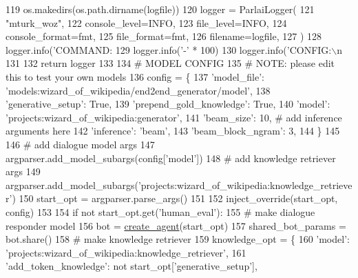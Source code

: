 \begin{DoxyCode}
{{119                 os.makedirs(os.path.dirname(logfile))
120         logger = ParlaiLogger(
121             \textcolor{stringliteral}{"mturk\_woz"},
122             console\_level=INFO,
123             file\_level=INFO,
124             console\_format=fmt,
125             file\_format=fmt,
126             filename=logfile,
127         )
128         logger.info(\textcolor{stringliteral}{'COMMAND: %
129         logger.info(\textcolor{stringliteral}{'-'} * 100)
130         logger.info(\textcolor{stringliteral}{'CONFIG:\(\backslash\)n%
131 
132         \textcolor{keywordflow}{return} logger
133 
134     \textcolor{comment}{# MODEL CONFIG}
135     \textcolor{comment}{# NOTE: please edit this to test your own models}
136     config = \{
137         \textcolor{stringliteral}{'model\_file'}: \textcolor{stringliteral}{'models:wizard\_of\_wikipedia/end2end\_generator/model'},
138         \textcolor{stringliteral}{'generative\_setup'}: \textcolor{keyword}{True},
139         \textcolor{stringliteral}{'prepend\_gold\_knowledge'}: \textcolor{keyword}{True},
140         \textcolor{stringliteral}{'model'}: \textcolor{stringliteral}{'projects:wizard\_of\_wikipedia:generator'},
141         \textcolor{stringliteral}{'beam\_size'}: 10,  \textcolor{comment}{# add inference arguments here}
142         \textcolor{stringliteral}{'inference'}: \textcolor{stringliteral}{'beam'},
143         \textcolor{stringliteral}{'beam\_block\_ngram'}: 3,
144     \}
145 
146     \textcolor{comment}{# add dialogue model args}
147     argparser.add\_model\_subargs(config[\textcolor{stringliteral}{'model'}])
148     \textcolor{comment}{# add knowledge retriever args}
149     argparser.add\_model\_subargs(\textcolor{stringliteral}{'projects:wizard\_of\_wikipedia:knowledge\_retriever'})
150     start\_opt = argparser.parse\_args()
151 
152     inject\_override(start\_opt, config)
153 
154     \textcolor{keywordflow}{if} \textcolor{keywordflow}{not} start\_opt.get(\textcolor{stringliteral}{'human\_eval'}):
155         \textcolor{comment}{# make dialogue responder model}
156         bot = \hyperlink{namespaceparlai_1_1core_1_1agents_a00d77a7e26fb89e8bd900f7b2a02982a}{create\_agent}(start\_opt)
157         shared\_bot\_params = bot.share()
158         \textcolor{comment}{# make knowledge retriever}
159         knowledge\_opt = \{
160             \textcolor{stringliteral}{'model'}: \textcolor{stringliteral}{'projects:wizard\_of\_wikipedia:knowledge\_retriever'},
161             \textcolor{stringliteral}{'add\_token\_knowledge'}: \textcolor{keywordflow}{not} start\_opt[\textcolor{stringliteral}{'generative\_setup'}],
}}}}
\end{DoxyCode}
